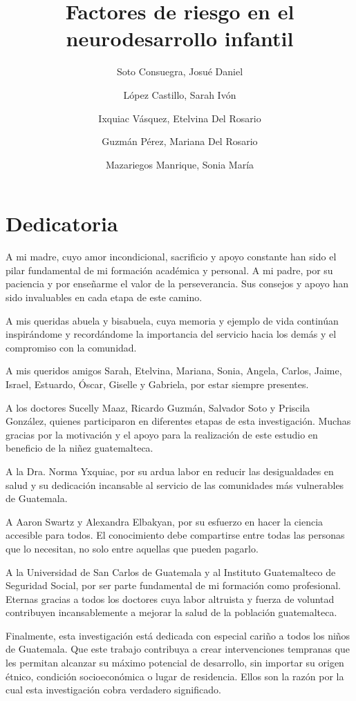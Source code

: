 \documentclass[11pt,letterpaper]{report}
\title{Factores de riesgo en el neurodesarrollo infantil}
\author{Soto Consuegra, Josué Daniel \and López Castillo, Sarah Ivón \and
Ixquiac Vásquez, Etelvina Del Rosario \and Guzmán Pérez, Mariana Del Rosario
\and Mazariegos Manrique, Sonia María}
\begin{document}






\chapter*{Dedicatoria}
A mi madre, cuyo amor incondicional, sacrificio y apoyo constante han sido el 
pilar fundamental de mi formación académica y personal. A mi padre, por su 
paciencia y por enseñarme el valor de la perseverancia. Sus consejos y apoyo 
han sido invaluables en cada etapa de este camino.

A mis queridas abuela y bisabuela, cuya memoria y ejemplo de vida continúan 
inspirándome y recordándome la importancia del servicio hacia los demás y el 
compromiso con la comunidad.

A mis queridos amigos Sarah, Etelvina, Mariana, Sonia, Angela, Carlos, Jaime, 
Israel, Estuardo, Óscar, Giselle y Gabriela, por estar siempre presentes.

A los doctores Sucelly Maaz, Ricardo Guzmán, Salvador Soto y Priscila González, 
quienes participaron en diferentes etapas de esta investigación. Muchas gracias 
por la motivación y el apoyo para la realización de este estudio en beneficio 
de la niñez guatemalteca.

A la Dra. Norma Yxquiac, por su ardua labor en reducir las desigualdades en 
salud y su dedicación incansable al servicio de las comunidades más vulnerables 
de Guatemala.

A Aaron Swartz y Alexandra Elbakyan, por su esfuerzo en hacer la ciencia 
accesible para todos. El conocimiento debe compartirse entre todas las personas 
que lo necesitan, no solo entre aquellas que pueden pagarlo.

A la Universidad de San Carlos de Guatemala y al Instituto Guatemalteco de 
Seguridad Social, por ser parte fundamental de mi formación como profesional. 
Eternas gracias a todos los doctores cuya labor altruista y fuerza de voluntad 
contribuyen incansablemente a mejorar la salud de la población guatemalteca.

Finalmente, esta investigación está dedicada con especial cariño a todos los 
niños de Guatemala. Que este trabajo contribuya a crear intervenciones tempranas 
que les permitan alcanzar su máximo potencial de desarrollo, sin importar su 
origen étnico, condición socioeconómica o lugar de residencia. Ellos son la 
razón por la cual esta investigación cobra verdadero significado.
\end{document}

